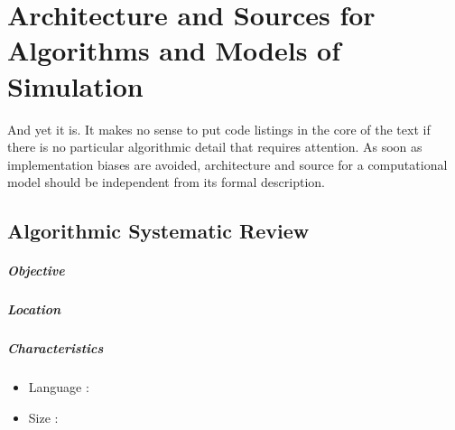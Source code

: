 


\chapter{Architecture and Sources for Algorithms and Models of Simulation} %

\label{app:code} %








And yet it is. It makes no sense to put code listings in the core of the text if there is no particular algorithmic detail that requires attention. As soon as implementation biases are avoided, architecture and source for a computational model should be independent from its formal description.



\newpage

\section{Algorithmic Systematic Review}

\paragraph{Objective}


\paragraph{Location}


\paragraph{Characteristics}

\begin{itemize}
\item Language : 
\item Size :
\end{itemize}


